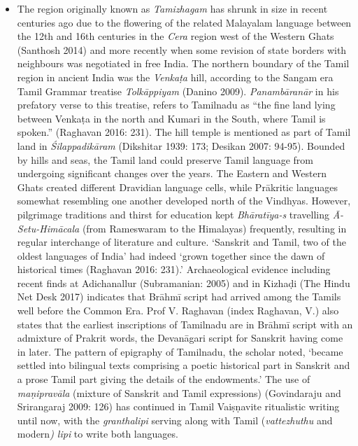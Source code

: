 \begin{itemize}
\item The region originally known as \textit{Tamizhagam} has shrunk in size in recent centuries ago due to the flowering of the related Malayalam language between the 12th and 16th centuries in the \textit{Cera} region west of the Western Ghats (Santhosh 2014) and more recently when some revision of state borders with neighbours was negotiated in free India. The northern boundary of the Tamil region in ancient India was the \textit{Venkaṭa} hill, according to the Sangam era Tamil Grammar treatise \textit{Tolkāppiyam} (Danino 2009). \textit{Panambāranār} in his prefatory verse to this treatise, refers to Tamilnadu as “the fine land lying between Venkaṭa in the north and Kumari in the South, where Tamil is spoken.” (Raghavan 2016: 231). The hill temple is mentioned as part of Tamil land in \textit{Śilappadikāram} (Dikshitar 1939: 173; Desikan 2007: 94-95). Bounded by hills and seas, the Tamil land could preserve Tamil language from undergoing significant changes over the years. The Eastern and Western Ghats created different Dravidian language cells, while Prākritic languages somewhat resembling one another developed north of the Vindhyas. However, pilgrimage traditions and thirst for education kept \textit{Bhāratīya-s} travelling \textit{Ā-Setu-Himācala} (from Rameswaram to the Himalayas) frequently, resulting in regular interchange of literature and culture. ‘Sanskrit and Tamil, two of the oldest languages of India’ had indeed ‘grown together since the dawn of historical times (Raghavan 2016: 231).’ Archaeological evidence including recent finds at Adichanallur (Subramanian: 2005) and in Kizhaḍi (The Hindu Net Desk 2017) indicates that Brāhmī script had arrived among the Tamils well before the Common Era. Prof V. Raghavan (index Raghavan, V.) also states that the earliest inscriptions of Tamilnadu are in Brāhmī script with an admixture of Prakrit words, the Devanāgari script for Sanskrit having come in later. The pattern of epigraphy of Tamilnadu, the scholar noted, ‘became settled into bilingual texts comprising a poetic historical part in Sanskrit and a prose Tamil part giving the details of the endowments.’ The use of \textit{maṇipravāla} (mixture of Sanskrit and Tamil expressions) (Govindaraju and Srirangaraj 2009: 126) has continued in Tamil Vaiṣṇavite ritualistic writing until now, with the \textit{granthalipi} serving along with Tamil (\textit{vattezhuthu} and modern\textit{) lipi} to write both languages.

\end{itemize}


